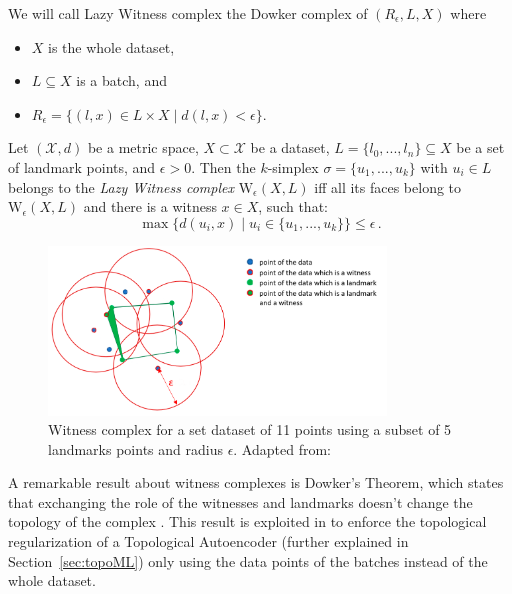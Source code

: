 \documentclass[../main.tex]{subfiles}
\begin{document}
We will call Lazy Witness complex the Dowker complex of $(R_\epsilon, L, X)$ where
\begin{itemize}
    \item $X$ is the whole dataset,
    \item $L\subseteq X$ is a batch, and
    \item $R_\epsilon=\{(l,x)\in L \times X \mid d(l,x)<\epsilon\}$. 
\end{itemize}

\begin{definition}
\label{def:witness}
Let $(\mathcal{X}, d)$ be a metric space, $X \subset \mathcal{X}$ be a dataset, $L = \{l_0, ..., l_n\} \subseteq X$ be a set of landmark points, and $\epsilon>0$. Then the $k$-simplex $\sigma = \{u_1, ..., u_k\}$ with $u_i \in L$ belongs to the \emph{Lazy Witness complex} $\text{W}_\epsilon(X, L)$ iff all its faces belong to $\text{W}_\epsilon(X, L)$ and there is a witness $x \in X$, such that:
\[
\max \{d(u_i, x) \mid u_i \in \{u_1, ..., u_k\}\} \leq \epsilon\,.
\]
\end{definition}

\begin{figure}[!ht]
\centering
\includegraphics[width=0.8\textwidth]{figures/bg/witnessCons.png} 
    \caption{Witness complex for a set  dataset of 11 points using a subset of 5 landmarks points and radius $\epsilon$. Adapted from: \cite{medbouhi_towards_2022}}
\label{fig:witnessCons}
\end{figure}

A remarkable result about witness complexes is Dowker's Theorem, which states that exchanging the role of the witnesses and landmarks doesn't change the topology of the complex \cite{dowker_homology_1952}. This result is exploited in \cite{schonenberger_witness_2022} to enforce the topological regularization of a Topological Autoencoder (further explained in Section~\ref{sec:topoML}) only using the data points of the batches instead of the whole dataset.
\end{document}
